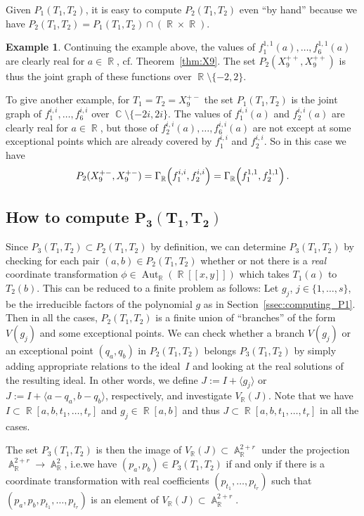 \documentclass[noend]{amsproc}
\theoremstyle{definition}
\newtheorem{example}[theorem]{Example}
\let\originalleft\left
\let\originalright\right
\renewcommand{\left}{\mathopen{}\mathclose\bgroup\originalleft}
\renewcommand{\right}{\aftergroup\egroup\originalright}
\DeclareMathOperator{\R}{\mathbb{R}}
\DeclareMathOperator{\C}{\mathbb{C}}
\DeclareMathOperator{\A}{\mathbb{A}}
\DeclareMathOperator{\Aut}{Aut}
\begin{document}
Given $P_1(T_1, T_2)$, it is easy to compute $P_2(T_1, T_2)$ even ``by hand''
because we have $P_2(T_1, T_2) = P_1(T_1, T_2) \cap (\R \times \R)$.

\begin{example}\label{ex:P2}
Continuing the example above, the values of
$f_1^{1,1}(a), \ldots, f_6^{1,1}(a)$ are clearly real for $a \in \R$, cf.\@
Theorem~\ref{thm:X9}. The set $P_2(X_9^{++}, X_9^{++})$ is thus the joint graph
of these functions over $\R \setminus \{-2, 2\}$.

To give another example, for $T_1 = T_2 = X_9^{+-}$ the set $P_1(T_1, T_2)$ is
the joint graph of $f_1^{i,i}, \ldots, f_6^{i,i}$ over
$\C \setminus \{-2i, 2i\}$. The values of $f_1^{i,i}(a)$ and $f_2^{i,i}(a)$ are
clearly real for $a \in \R$, but those of $f_2^{i,i}(a), \ldots, f_6^{i,i}(a)$
are not except at some exceptional points which are already covered by
$f_1^{i,i}$ and $f_2^{i,i}$. So in this case we have
\[
P_2(X_9^{+-}, X_9^{+-}) = \Gamma_{\R} \left(f_1^{i,i}, f_2^{i,i}\right)
= \Gamma_{\R} \left(f_1^{1,1}, f_2^{1,1}\right) \,.
\]
\end{example}


\subsection{How to compute $\boldsymbol{P_3(T_1, T_2)}$}

Since $P_3(T_1, T_2) \subset P_2(T_1, T_2)$ by definition, we can determine
$P_3(T_1, T_2)$ by checking for each pair $(a,b) \in P_2(T_1, T_2)$ whether or
not there is a \emph{real} coordinate transformation
$\phi \in \Aut_{\R}(\R[[x,y]])$ which takes $T_1(a)$ to $T_2(b)$. This can be
reduced to a finite problem as follows: Let $g_j$, $j \in \{1,\ldots,s\}$, be
the irreducible factors of the polynomial $g$ as in
Section~\ref{ssec:computing_P1}. Then in all the cases, $P_2(T_1, T_2)$ is a
finite union of ``branches'' of the form $V(g_j)$ and some exceptional points.
We can check whether a branch $V(g_j)$ or an exceptional point $(q_a, q_b)$ in
$P_2(T_1, T_2)$ belongs $P_3(T_1, T_2)$ by simply adding appropriate relations
to the ideal~$I$ and looking at the real solutions of the resulting ideal. In
other words, we define $J := I+\langle g_j \rangle$ or
$J := I+\langle a-q_a, b-q_b \rangle$, respectively, and investigate
$V_{\R}(J)$. Note that we have $I \subset \R[a,b,t_1,\ldots,t_r]$ and
$g_j \in \R[a,b]$ and thus $J \subset \R[a,b,t_1,\ldots,t_r]$ in all the cases.

The set $P_3(T_1, T_2)$ is then the image of $V_{\R}(J) \subset \A_{\R}^{2+r}$
under the projection $\A_{\R}^{2+r} \rightarrow \A_{\R}^2$, i.e.\@ we have
$(p_a, p_b) \in P_3(T_1, T_2)$ if and only if there is a coordinate
transformation with real coefficients $(p_{t_1}, \ldots, p_{t_r})$ such that
$(p_a, p_b, p_{t_1}, \ldots, p_{t_r})$ is an element of
$V_{\R}(J) \subset \A_{\R}^{2+r}$.
\end{document}
